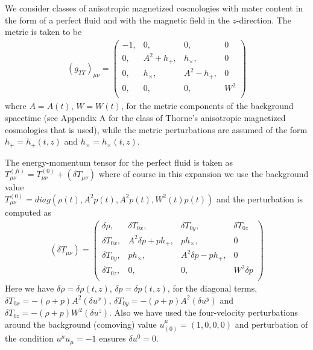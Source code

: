 \documentclass[prd,twocolumn,showpacs,preprintnumbers,amsmath,amssy mb]{revtex4}
\newcommand{\bea}{\begin{eqnarray}}
\newcommand{\eea}{\end{eqnarray}}
\begin{document}
We consider classes of anisotropic magnetized cosmologies 
with mater content in the form of a perfect fluid and with 
the magnetic field in the $z$-direction. The metric is 
taken to be  
\bea
\label{metr}
(g_{TT})_{\mu \nu }=
\left(
\begin{array}{cccc}
-1,   &0,          &0,          &0\\
0,    &A^{2}+h_{+},&h_{\times},      &0\\
0,    &h_{\times},      &A^{2}-h_{+},&0\\
0,    &0,          &0,          &W^{2}\\
\end{array}\right)
\eea
where $A=A(t)$, $W=W(t)$,  
for the metric components of the background spacetime 
(see Appendix A for the class of Thorne's anisotropic 
magnetized cosmologies that is used), 
while the metric perturbations are assumed of the form 
$h_{+}=h_{+}(t,z)$ and $h_{\times}=h_{\times}(t,z)$.


The energy-momentum tensor for the perfect fluid is 
taken as $T^{(fl)}_{\mu \nu }=T_{\mu \nu }^{(0)}+
(\delta T_{\mu \nu })$ where of course in this expansion 
we use the background value\\ 
$T_{\mu \nu }^{(0)}=diag(\rho (t), A^{2}p(t), A^{2}p(t), 
W^{2}(t)p(t))$ and the perturbation is computed as 
\bea
\label{fluten}
(\delta T_{\mu \nu })=
\left(
\begin{array}{cccc}
\delta \rho,   &\delta T_{0x},&\delta T_{0y},&\delta T_{0z}\\
\delta T_{0x},    &A^{2}\delta p+ph_{+},&ph_{\times}, &0\\
\delta T_{0y},    &ph_{\times}, &A^{2}\delta p-ph_{+},&0\\
\delta T_{0z},    &0,          &0,          &W^{2}\delta p\\
\end{array}\right)
\eea
Here we have $\delta \rho =\delta \rho (t,z)$,  
$\delta p=\delta p(t,z)$, for the diagonal terms, 
$\delta T_{0x}=-(\rho +p)A^{2}(\delta u^{x})$, 
$\delta T_{0y}=-(\rho +p)A^{2}(\delta u^{y})$ and 
$\delta T_{0z}=-(\rho +p)W^{2}(\delta u^{z})$. Also we 
have used the four-velocity perturbations around the 
background (comoving) value $u^{\mu }_{(0)}=(1,0,0,0)$ 
and perturbation of the condition $u^{\mu }u_{\mu }=-1$ 
ensures $\delta u^{0}=0$. 
\end{document}
